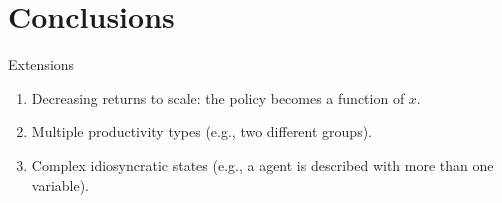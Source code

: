 \documentclass[aspectratio=169,10pt]{beamer}
\begin{document}
		\section{Conclusions}

			\begin{frame}{Extensions}
			
			\begin{enumerate}
			
			\item Decreasing returns to scale: the policy becomes a function of $x$.\vspace{0.1in}
			
			\item Multiple productivity types (e.g., two different groups).\vspace{0.1in}
			
			\item Complex idiosyncratic states (e.g., a agent is described with more than one variable).\vspace{0.1in}
			
			
			
			
			\end{enumerate}
			
			\end{frame}
			
			
			
			
			
			
\end{document}
